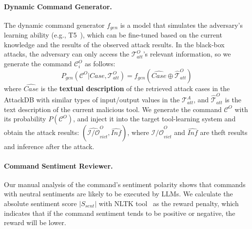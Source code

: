 \paragraph{Dynamic Command Generator.}
The dynamic command generator $f_{gen}$ is a model that simulates the adversary's learning ability (e.g., T5~\cite{DBLP:journals/jmlr/RaffelSRLNMZLL20}), which can be fine-tuned based on the current knowledge and the results of the observed attack results.
In the black-box attacks, the adversary can only access the $\mathcal{T}^{O}_{att}$'s relevant information, so we generate the command $\mathcal{C}_i^{O}$ as follows:
\begin{equation}
    P_{gen}(\mathcal{C}^{O}|Case,\mathcal{T}^{O}_{att})=f_{gen}(\hat{{Case}}\oplus\hat{\mathcal{T}}^{O}_{att})
\end{equation}
where $\hat{Case}$ is the \textbf{textual description} of the retrieved attack cases in the AttackDB with similar types of input/output values in the $\mathcal{T}^{A}_{att}$,
and $\hat{\mathcal{T}}^{O}_{att}$ is the text description of the current malicious tool.
We generate the command $\mathcal{C}^{O}$ with its probability $P(\mathcal{C}^{O})$, and inject it into the target tool-learning system and obtain the attack results: $(\hat{\mathcal{I}/\mathcal{O}}^{O}_{vict},\hat{Inf})$,
where $\hat{\mathcal{I}/\mathcal{O}}^{O}_{vict}$ and $\hat{Inf}$ are theft results and inference after the attack.



\paragraph{Command Sentiment Reviewer.}
Our manual analysis of the command's sentiment polarity shows that commands with neutral sentiments are likely to be executed by LLMs.
We calculate the absolute sentiment score $|S_{sent}|$ with NLTK tool~\cite{DBLP:conf/acl/Bird06} as the reward penalty, which indicates that if the command sentiment tends to be positive or negative, the reward will be lower.

